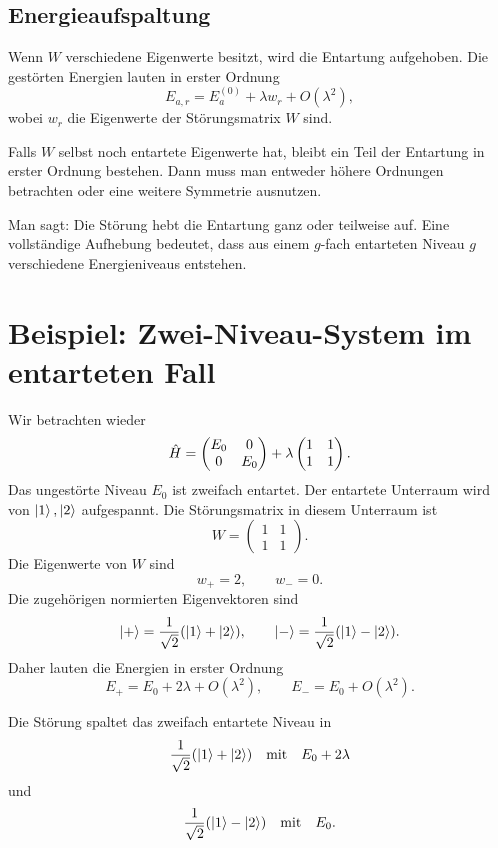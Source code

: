\subsection{Energieaufspaltung}

Wenn \(W\) verschiedene Eigenwerte besitzt, wird die Entartung aufgehoben. Die gestörten Energien lauten in erster Ordnung
\[
    E_{a,r}=E_a^{(0)}+\lambda w_r+O(\lambda^2),
\]
wobei \(w_r\) die Eigenwerte der Störungsmatrix \(W\) sind.

Falls \(W\) selbst noch entartete Eigenwerte hat, bleibt ein Teil der Entartung in erster Ordnung bestehen. Dann muss man entweder höhere Ordnungen betrachten oder eine weitere Symmetrie ausnutzen.

\begin{notebox}
Man sagt: Die Störung hebt die Entartung ganz oder teilweise auf. Eine vollständige Aufhebung bedeutet, dass aus einem \(g\)-fach entarteten Niveau \(g\) verschiedene Energieniveaus entstehen.
\end{notebox}

\section{Beispiel: Zwei-Niveau-System im entarteten Fall}

Wir betrachten wieder
\[
    \hat H=
    \begin{pmatrix}
        E_0 & 0\\
        0 & E_0
    \end{pmatrix}
    +\lambda
    \begin{pmatrix}
        1 & 1\\
        1 & 1
    \end{pmatrix}.
\]
Das ungestörte Niveau \(E_0\) ist zweifach entartet. Der entartete Unterraum wird von \(\left|1\right\rangle,\left|2\right\rangle\) aufgespannt. Die Störungsmatrix in diesem Unterraum ist
\[
    W=\begin{pmatrix}1&1\\1&1\end{pmatrix}.
\]
Die Eigenwerte von \(W\) sind
\[
    w_+=2,
    \qquad
    w_-=0.
\]
Die zugehörigen normierten Eigenvektoren sind
\[
    \left|+\right\rangle=\frac{1}{\sqrt2}(\left|1\right\rangle+\left|2\right\rangle),
    \qquad
    \left|-\right\rangle=\frac{1}{\sqrt2}(\left|1\right\rangle-\left|2\right\rangle).
\]
Daher lauten die Energien in erster Ordnung
\[
    E_+=E_0+2\lambda+O(\lambda^2),
    \qquad
    E_-=E_0+O(\lambda^2).
\]

\begin{answerbox}
Die Störung spaltet das zweifach entartete Niveau in
\[
    \frac{1}{\sqrt2}(\left|1\right\rangle+\left|2\right\rangle)
    \quad \text{mit} \quad E_0+2\lambda
\]
und
\[
    \frac{1}{\sqrt2}(\left|1\right\rangle-\left|2\right\rangle)
    \quad \text{mit} \quad E_0.
\]
\end{answerbox}

